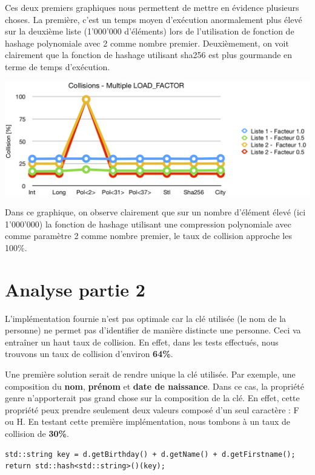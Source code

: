 \documentclass[11pt,a4paper]{article}
\begin{document}
Ces deux premiers graphiques nous permettent de mettre en évidence plusieurs choses. La première, c'est un temps moyen d'exécution anormalement plus élevé sur la deuxième liste (1'000'000 d'éléments) lors de l'utilisation de fonction de hashage polynomiale avec 2 comme nombre premier. Deuxièmement, on voit clairement que la fonction de hashage utilisant sha256 est plus gourmande en terme de temps d'exécution.

\includegraphics[width=\textwidth,keepaspectratio]{collisions_chart.png}

Dans ce graphique, on observe clairement que sur un nombre d'élément élevé (ici 1'000'000) la fonction de hashage utilisant une compression polynomiale avec comme paramètre 2 comme nombre premier, le taux de collision approche les 100\%.

\section{Analyse partie 2}
L'implémentation fournie n'est pas optimale car la clé utilisée (le nom de la personne) ne permet pas d'identifier de manière distincte une personne. Ceci va entraîner un haut taux de collision. En effet, dans les tests effectués, nous trouvons un taux de collision d'environ \textbf{64\%}.

Une  première solution serait de rendre unique la clé utilisée. Par exemple, une composition du \textbf{nom}, \textbf{prénom} et \textbf{date de naissance}. Dans ce cas, la propriété genre n'apporterait pas grand chose sur la composition de la clé. En effet, cette propriété peux prendre seulement deux valeurs composé d'un seul caractère : F ou H. En testant cette première implémentation, nous tombons à un taux de collision de \textbf{30\%}.

\begin{lstlisting}[frame=single] 
std::string key = d.getBirthday() + d.getName() + d.getFirstname();
return std::hash<std::string>()(key);
\end{lstlisting}
\end{document}
